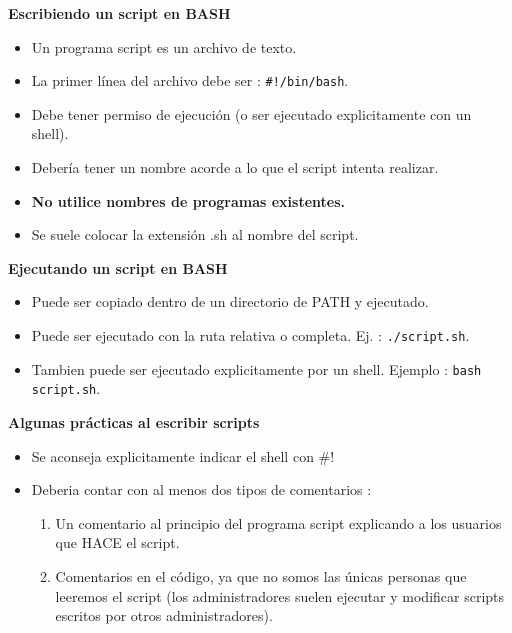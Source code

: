 \documentclass{beamer}
\begin{document}
\begin{frame}{}
\textbf{Escribiendo un script en BASH }
\begin{itemize}
\item Un programa script es un archivo de texto.
\item La primer línea del archivo debe ser : \texttt{\#!/bin/bash}.
\item Debe tener permiso de ejecución (o ser ejecutado explicitamente con un shell).
\item Debería tener un nombre acorde a lo que el script intenta realizar.
\item \textbf{No utilice nombres de programas existentes.}
\item Se suele colocar la extensión .sh al nombre del script.
\end{itemize}

\end{frame}


\begin{frame}{}
\textbf{Ejecutando un script en BASH }
\begin{itemize}
\item Puede ser copiado dentro de un directorio de PATH y ejecutado.
\item Puede ser ejecutado con la ruta relativa o completa. Ej. : \texttt{./script.sh}.
\item Tambien puede ser ejecutado explicitamente por un shell. Ejemplo : \texttt{bash script.sh}.
\end{itemize}

\end{frame}


\begin{frame}{}
\textbf{Algunas prácticas al escribir scripts }
\begin{itemize}
\item Se aconseja explicitamente indicar el shell con \#!
\item Deberia contar con al menos dos tipos de comentarios :
\begin{enumerate}
\item Un comentario al principio del programa script explicando a los usuarios que HACE el script.
\item Comentarios en el código, ya que no somos las únicas personas que leeremos el script 
(los administradores suelen ejecutar y modificar scripts escritos por otros administradores).
\end{enumerate}
\end{itemize}

\end{frame}
\end{document}
